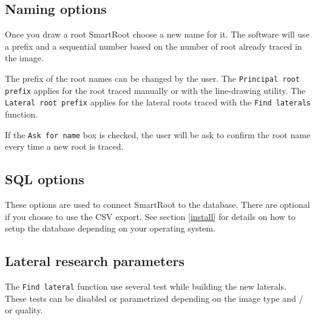 \documentclass[a4paper,english,10pt]{report}
\begin{document}
\subsection{Naming options}
\label{name_options}

Once you draw a root SmartRoot choose a new name for it. The software will use a prefix and a sequential number based on the number of root already traced in the image. 

The prefix of the root names can be changed by the user. The \verb|Principal root prefix| applies for the root traced manually or with the line-drawing utility. The \verb|Lateral root prefix| applies for the lateral roots traced with the \verb|Find laterals| function. 

If the \verb|Ask for name| box is checked, the user will be ask to confirm the root name every time a new root is traced. 

\subsection{SQL options}
\label{sql_options}

These options are used to connect SmartRoot to the database. There are optional if you choose to use the CSV export. See section \ref{install} for details on how to setup the database depending on your operating system.


\subsection{Lateral research parameters}
\label{lat_options} 

The \verb|Find lateral| function use several test while building the new laterals. These tests can be disabled or parametrized depending on the image type and / or quality.
\end{document}
